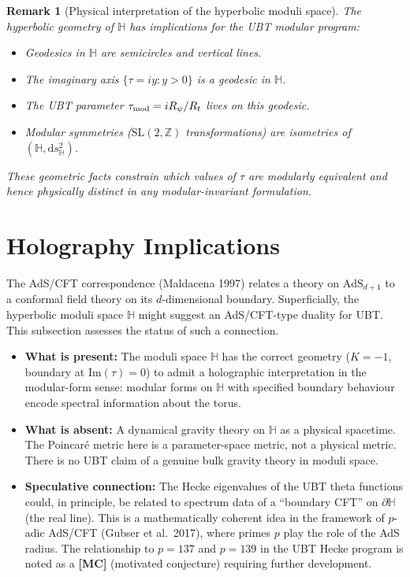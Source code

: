 \documentclass[11pt,a4paper]{article}
\newtheorem{remark}{Remark}
\begin{document}
\begin{remark}[Physical interpretation of the hyperbolic moduli space]
The hyperbolic geometry of $\mathbb{H}$ has implications for the UBT modular program:
\begin{itemize}
  \item Geodesics in $\mathbb{H}$ are semicircles and vertical lines.
  \item The imaginary axis $\{\tau = iy : y > 0\}$ is a geodesic in $\mathbb{H}$.
  \item The UBT parameter $\tau_{\rm mod} = iR_\psi/R_t$ lives on this geodesic.
  \item Modular symmetries ($\mathrm{SL}(2,\mathbb{Z})$ transformations) are
    isometries of $(\mathbb{H}, \mathrm{d}s^2_{\mathbb{H}})$.
\end{itemize}
These geometric facts constrain which values of $\tau$ are modularly equivalent
and hence \emph{physically distinct} in any modular-invariant formulation.
\end{remark}

\section{Holography Implications}
\label{sec:holography}

The AdS/CFT correspondence (Maldacena 1997) relates a theory on $\mathrm{AdS}_{d+1}$
to a conformal field theory on its $d$-dimensional boundary. Superficially, the
hyperbolic moduli space $\mathbb{H}$ might suggest an AdS/CFT-type duality for UBT.
This subsection assesses the status of such a connection.

\begin{itemize}
  \item \textbf{What is present:} The moduli space $\mathbb{H}$ has the correct
    geometry ($K = -1$, boundary at $\mathrm{Im}(\tau) = 0$) to admit a holographic
    interpretation in the modular-form sense: modular forms on $\mathbb{H}$ with
    specified boundary behaviour encode spectral information about the torus.
  
  \item \textbf{What is absent:} A dynamical gravity theory on $\mathbb{H}$ as a
    physical spacetime. The Poincaré metric here is a parameter-space metric, not
    a physical metric. There is no UBT claim of a genuine bulk gravity theory in
    moduli space.
  
  \item \textbf{Speculative connection:} The Hecke eigenvalues of the UBT theta
    functions could, in principle, be related to spectrum data of a ``boundary CFT''
    on $\partial\mathbb{H}$ (the real line). This is a mathematically coherent idea
    in the framework of $p$-adic AdS/CFT (Gubser et al.\ 2017), where primes $p$
    play the role of the AdS radius. The relationship to $p = 137$ and $p = 139$
    in the UBT Hecke program is noted as a \textbf{[MC]} (motivated conjecture)
    requiring further development.
\end{itemize}
\end{document}
